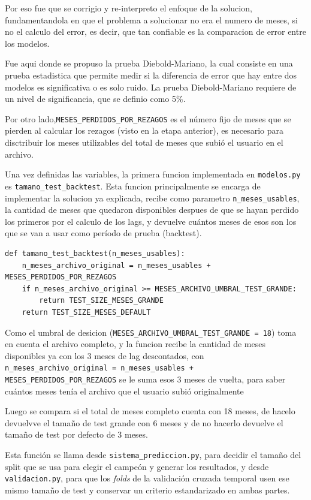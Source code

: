 Por eso fue que se corrigio y re-interpreto el enfoque de la solucion, fundamentandola en que el problema a solucionar no era el numero de meses, si no el calculo del error, es decir, que tan confiable es la comparacion de error entre los modelos. 

Fue aqui donde se propuso la prueba Diebold-Mariano, la cual consiste en una prueba estadistica que permite medir si la diferencia de error que hay entre dos modelos es significativa o es solo ruido. La prueba Diebold-Mariano requiere de un nivel de significancia, que se definio como 5\%.

Por otro lado,\texttt{MESES\_PERDIDOS\_POR\_REZAGOS} es el número fijo de meses que se pierden al calcular los rezagos (visto en la etapa anterior), es necesario para disctribuir los meses utilizables del total de meses que subió el usuario en el archivo.

Una vez definidas las variables, la primera funcion implementada en \texttt{modelos.py} es \texttt{tamano\_test\_backtest}. Esta funcion principalmente se encarga de implementar la solucion ya explicada, recibe como parametro \texttt{n\_meses\_usables}, la cantidad de meses que quedaron disponibles despues de que se hayan perdido los primeros por el calculo de los lags, y devuelve cuántos meses de esos son los que se van a usar como período de prueba (backtest).

\begin{verbatim}
def tamano_test_backtest(n_meses_usables):
    n_meses_archivo_original = n_meses_usables + MESES_PERDIDOS_POR_REZAGOS
    if n_meses_archivo_original >= MESES_ARCHIVO_UMBRAL_TEST_GRANDE:
        return TEST_SIZE_MESES_GRANDE
    return TEST_SIZE_MESES_DEFAULT
\end{verbatim}

Como el umbral de desicion (\texttt{MESES\_ARCHIVO\_UMBRAL\_TEST\_GRANDE = 18}) toma en cuenta el archivo completo, y la funcion recibe la cantidad de meses disponibles ya con los 3 meses de lag descontados, con \texttt{n\_meses\_archivo\_original = n\_meses\_usables + MESES\_PERDIDOS\_POR\_REZAGOS} se le suma esos 3 meses de vuelta, para saber cuántos meses tenía el archivo que el usuario subió originalmente

Luego se compara si el total de meses completo cuenta con 18 meses, de hacelo devuelvve el tamaño de test grande con 6 meses y de no hacerlo devuelve el tamaño de test por defecto de 3 meses.

Esta función se llama desde \texttt{sistema\_prediccion.py}, para decidir el tamaño del split que se usa para elegir el campeón y generar los resultados, y desde \texttt{validacion.py}, para que los \textit{folds} de la validación cruzada temporal usen ese mismo tamaño de test y conservar un criterio estandarizado en ambas partes.

